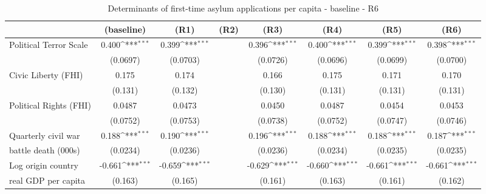 \begin{table}[htbp]\centering
	 \scriptsize
	 	\def\sym#1{\ifmmode^{#1}\else\(^{#1}\)\fi}
	\caption{Determinants of first-time asylum applications per capita - baseline - R6}
	\begin{tabular}{l*{7}{c}}
		\hline\hline
		&\multicolumn{1}{c}{(baseline)}     &\multicolumn{1}{c}{(R1)}       &\multicolumn{1}{c}{(R2)}       &\multicolumn{1}{c}{(R3)}    	&\multicolumn{1}{c}{(R4)}  	&\multicolumn{1}{c}{(R5)}   &\multicolumn{1}{c}{(R6)}         	\\
\hline
Political Terror Scale&       0.400\sym{***}&       0.399\sym{***}&                     &       0.396\sym{***}&       0.400\sym{***}&       0.399\sym{***}&       0.398\sym{***}\\
                    &    (0.0697)         &    (0.0703)         &                     &    (0.0726)         &    (0.0696)         &    (0.0699)         &    (0.0700)         \\
[0,5em]
Civic Liberty (FHI) &       0.175         &       0.174         &                     &       0.166         &       0.175         &       0.171         &       0.170         \\
                    &     (0.131)         &     (0.132)         &                     &     (0.130)         &     (0.131)         &     (0.131)         &     (0.131)         \\
[0,5em]
Political Rights (FHI)&      0.0487         &      0.0473         &                     &      0.0450         &      0.0487         &      0.0454         &      0.0453         \\
                    &    (0.0752)         &    (0.0753)         &                     &    (0.0738)         &    (0.0752)         &    (0.0747)         &    (0.0746)         \\
[0,5em]
Quarterly civil war&       0.188\sym{***}&       0.190\sym{***}&                     &       0.196\sym{***}&       0.188\sym{***}&       0.188\sym{***}&       0.187\sym{***}\\
 battle death (000s)                    &    (0.0234)         &    (0.0236)         &                     &    (0.0236)         &    (0.0234)         &    (0.0235)         &    (0.0235)         \\
[0,5em]
Log origin country &      -0.661\sym{***}&      -0.659\sym{***}&                     &      -0.629\sym{***}&      -0.660\sym{***}&      -0.661\sym{***}&      -0.661\sym{***}\\
real GDP per capita                    &     (0.163)         &     (0.165)         &                     &     (0.161)         &     (0.163)         &     (0.161)         &     (0.162)         \\

\end{tabular}
\end{table}
